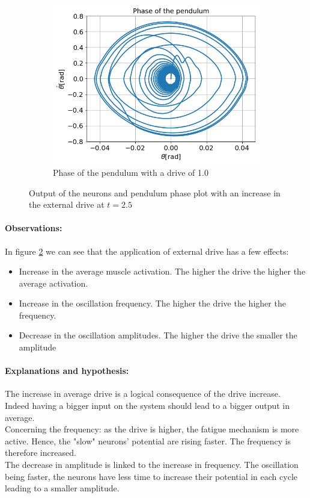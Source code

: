 \documentclass{cmc}
\begin{document}
\begin{figure}[H]
\begin{subfigure}[b]{0.3\textwidth}
     \centering
      \includegraphics[width=\textwidth]{figures/3_b_1dot0_phase.png}
    \caption{Phase of the pendulum with a drive of 1.0}
    \label{fig:3b_phase}
  \end{subfigure}
  \caption{Output of the neurons and pendulum phase plot with an increase in the external drive at $t=2.5$}
  \label{fig:3b}
\end{figure}
\paragraph{Observations:}In figure \ref{fig:3b} we can see that the application of external drive has a few effects: 
\begin{itemize}
    \item Increase in the average muscle activation. The higher the drive the higher the average activation.
    \item Increase in the oscillation frequency. The higher the drive the higher the frequency.
    \item Decrease in the oscillation amplitudes. The higher the drive the smaller the amplitude
\end{itemize}

\paragraph{Explanations and hypothesis:}The increase in average drive is a logical consequence of the drive increase. Indeed having a bigger input on the system should lead to a bigger output in average.\\
Concerning the frequency: as the drive is higher, the fatigue mechanism is more active. Hence, the "slow" neurons' potential are rising faster. The frequency is therefore increased.\\
The decrease in amplitude is linked to the increase in frequency. The oscillation being faster, the neurons have less time to increase their potential in each cycle leading to a smaller amplitude.
\end{document}

